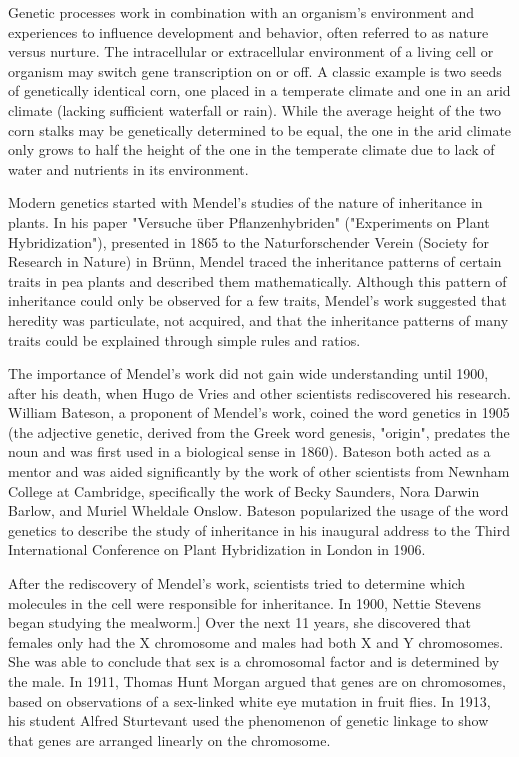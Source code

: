 Genetic processes work in combination with an organism's environment and experiences to influence
development and behavior, often referred to as nature versus nurture.
The intracellular or extracellular environment of a living cell or organism may switch gene 
transcription on or off. 
A classic example is two seeds of genetically identical corn, one placed in a temperate
climate and one in an arid climate (lacking sufficient waterfall or rain).
While the average height of the two corn stalks may be genetically determined to be equal, 
the one in the arid climate only grows to half the height of the one in the temperate climate
due to lack of water and nutrients in its environment. 

Modern genetics started with Mendel's studies of the nature of inheritance in plants.
In his paper "Versuche über Pflanzenhybriden" ("Experiments on Plant Hybridization"), 
presented in 1865 to the Naturforschender Verein (Society for Research in Nature) in Brünn,
Mendel traced the inheritance patterns of certain traits in pea plants and described them
mathematically.
Although this pattern of inheritance could only be observed for a few traits, Mendel's work 
suggested that heredity was particulate, not acquired, and that the inheritance patterns of
many traits could be explained through simple rules and ratios.

The importance of Mendel's work did not gain wide understanding until 1900, after his death,
when Hugo de Vries and other scientists rediscovered his research.
William Bateson, a proponent of Mendel's work, coined the word genetics in 1905
(the adjective genetic, derived from the Greek word genesis, "origin", predates the noun and was
first used in a biological sense in 1860).
Bateson both acted as a mentor and was aided significantly by the work of other scientists from
Newnham College at Cambridge, specifically the work of Becky Saunders, Nora Darwin Barlow, and 
Muriel Wheldale Onslow.
Bateson popularized the usage of the word genetics to describe the study of inheritance in his
inaugural address to the Third International Conference on Plant Hybridization in
London in 1906.

After the rediscovery of Mendel's work, scientists tried to determine which molecules in the cell
were responsible for inheritance. 
In 1900, Nettie Stevens began studying the mealworm.] Over the next 11 years, she discovered that
females only had the X chromosome and males had both X and Y chromosomes.
She was able to conclude that sex is a chromosomal factor and is determined by the male.
In 1911, Thomas Hunt Morgan argued that genes are on chromosomes, based on observations of a
sex-linked white eye mutation in fruit flies.
In 1913, his student Alfred Sturtevant used the phenomenon of genetic linkage to show that genes
are arranged linearly on the chromosome.

